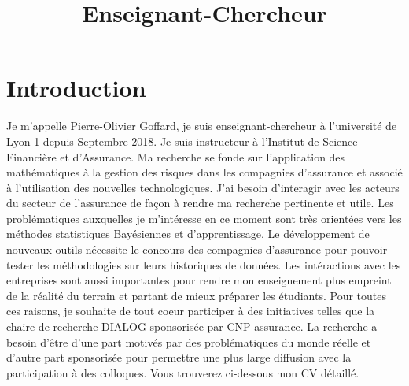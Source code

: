 \documentclass[11pt,a4paper]{moderncv}
\title{Enseignant-Chercheur}
\begin{document}
\maketitle

\section{Introduction}
Je m'appelle Pierre-Olivier Goffard, je suis enseignant-chercheur à l'université de Lyon 1 depuis Septembre 2018. Je suis instructeur à l'Institut de Science Financière et d'Assurance. Ma recherche se fonde sur l'application des mathématiques à la gestion des risques dans les compagnies d'assurance et associé à l'utilisation des nouvelles technologiques. J'ai besoin d'interagir avec les acteurs du secteur de l'assurance de façon à rendre ma recherche pertinente et utile. Les problématiques auxquelles je m'intéresse en ce moment sont très orientées vers les méthodes statistiques Bayésiennes et d'apprentissage. Le développement de nouveaux outils nécessite le concours des compagnies d'assurance pour pouvoir tester les méthodologies sur leurs historiques de données. Les intéractions avec les entreprises sont aussi importantes pour rendre mon enseignement plus empreint de la réalité du terrain et partant de mieux préparer les étudiants. Pour toutes ces raisons, je souhaite de tout coeur participer à des initiatives telles que la chaire de recherche DIALOG sponsorisée par CNP assurance. La recherche a besoin d'être d'une part motivés par des problématiques du monde réelle et d'autre part sponsorisée pour permettre une plus large diffusion avec la participation à des colloques. Vous trouverez ci-dessous mon CV détaillé.  
\end{document}
